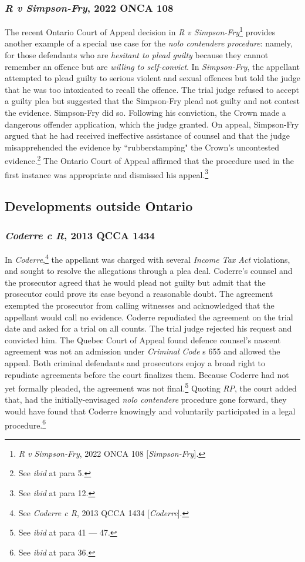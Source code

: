 \subsubsection{\textit{R v Simpson-Fry}, 2022 ONCA 108}

The recent Ontario Court of Appeal decision in \textit{R v Simpson-Fry}\footnote{\textit{R v Simpson-Fry}, 2022 ONCA 108 [\textit{Simpson-Fry}].} provides another example of a special use case for the \textit{nolo contendere} \textit{procedure}: namely, for those defendants who are \textit{hesitant to plead guilty} because they cannot remember an offence but are \textit{willing to self-convict}. In \textit{Simpson-Fry}, the appellant attempted to plead guilty to serious violent and sexual offences but told the judge that he was too intoxicated to recall the offence. The trial judge refused to accept a guilty plea but suggested that the Simpson-Fry plead not guilty and not contest the evidence. Simpson-Fry did so. Following his conviction, the Crown made a dangerous offender application, which the judge granted. On appeal, Simpson-Fry argued that he had received ineffective assistance of counsel and that the judge misapprehended the evidence by ``rubberstamping" the Crown's uncontested evidence.\footnote{See \textit{ibid} at para 5.} The Ontario Court of Appeal affirmed that the procedure used in the first instance was appropriate and dismissed his appeal.\footnote{See \textit{ibid} at para 12.}

\subsection{Developments outside Ontario}
\subsubsection{\textit{Coderre c R}, 2013 QCCA 1434}
In \textit{Coderre},\footnote{See \textit{Coderre c R}, 2013 QCCA 1434 [\textit{Coderre}].} the appellant was charged with several \textit{Income Tax Act} violations, and sought to resolve the allegations through a plea deal. Coderre's counsel and the prosecutor agreed that he would plead not guilty but admit that the prosecutor could prove its case beyond a reasonable doubt. The agreement exempted the prosecutor from calling witnesses and acknowledged that the appellant would call no evidence. Coderre repudiated the agreement on the trial date and asked for a trial on all counts. The trial judge rejected his request and convicted him. The Quebec Court of Appeal found defence counsel's nascent agreement was not an admission under \textit{Criminal Code} s 655 and allowed the appeal. Both criminal defendants and prosecutors enjoy a broad right to repudiate agreements before the court finalizes them. Because Coderre had not yet formally pleaded, the agreement was not final.\footnote{See \textit{ibid} at para 41 — 47.} Quoting \textit{RP}, the court added that, had the initially-envisaged \textit{nolo contendere} procedure gone forward, they would have found that Coderre knowingly and voluntarily participated in a legal procedure.\footnote{See \textit{ibid} at para 36.}

